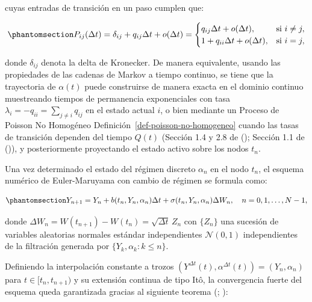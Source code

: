 \documentclass[
  spanish,
  us-letterpaper,
]{scrreprt}
\numberwithin{equation}{section}
\theoremstyle{plain}
\theoremstyle{plain}
\theoremstyle{definition}
\theoremstyle{plain}
\theoremstyle{remark}
\begin{document}
cuyas entradas de transición en un paso cumplen que:

\begin{equation}\phantomsection\label{eq-prob-transicion-paso}{
P_{ij}(\Delta t) = \delta_{ij} + q_{ij}\Delta t + o(\Delta t) = 
\begin{cases} 
q_{ij}\Delta t + o(\Delta t), & \text{si } i \neq j, \\ 
1 + q_{ii}\Delta t + o(\Delta t), & \text{si } i = j,
\end{cases}
}\end{equation}

donde \(\delta_{ij}\) denota la delta de Kronecker. De manera
equivalente, usando las propiedades de las cadenas de Markov a tiempo
continuo, se tiene que la trayectoria de \(\alpha(t)\) puede construirse
de manera exacta en el dominio continuo muestreando tiempos de
permanencia exponenciales con tasa
\(\displaystyle \lambda_i = -q_{ii} = \sum_{j \neq i} q_{ij}\) en el
estado actual \(i\), o bien mediante un Proceso de Poisson No Homogéneo
Definición~\ref{def-poisson-no-homogeneo} cuando las tasas de transición
dependen del tiempo \(Q(t)\) (Sección 1.4 y 2.8 de
(); Sección 1.1 de
()), y
posteriormente proyectando el estado activo sobre los nodos \(t_n\).

Una vez determinado el estado del régimen discreto \(\alpha_n\) en el
nodo \(t_n\), el esquema numérico de Euler-Maruyama con cambio de
régimen se formula como:

\begin{equation}\phantomsection\label{eq-esquema-em-switching}{
Y_{n+1} = Y_n + b(t_n, Y_n, \alpha_n)\Delta t + \sigma(t_n, Y_n, \alpha_n)\Delta W_n, \quad n = 0, 1, \dots, N - 1,
}\end{equation}

donde \(\Delta W_n = W(t_{n+1}) - W(t_n) = \sqrt{\Delta t}\, Z_n\) con
\(\{Z_n\}\) una sucesión de variables aleatorias normales estándar
independientes \(\mathcal{N}(0, 1)\) independientes de la filtración
generada por \(\{Y_k, \alpha_k : k \le n\}\).

Definiendo la interpolación constante a trozos
\((Y^{\Delta t}(t), \alpha^{\Delta t}(t)) = (Y_n, \alpha_n)\) para
\(t \in [t_n, t_{n+1})\) y su extensión continua de tipo Itô, la
convergencia fuerte del esquema queda garantizada gracias al siguiente
teorema (;
):
\end{document}

